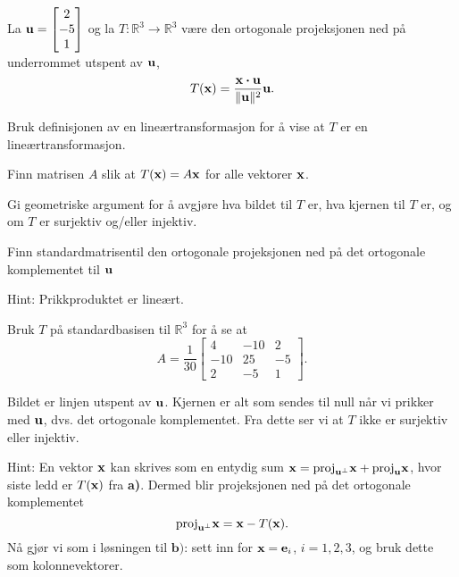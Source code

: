 
\begin{oppgave}
La $\mathbf{u}=\begin{bmatrix} 2 \\ -5 \\ 1 \end{bmatrix}$ og la $T:\mathbb{R}^3\rightarrow \mathbb{R}^3$ være den ortogonale projeksjonen ned på underrommet utspent av $\mathbf{u}$,
$$T(\mathbf{x})=\frac{\mathbf{x}\boldsymbol{\cdot} \mathbf{u}}{\|\mathbf{u} \|^2} \mathbf{u}.$$

\begin{punkt}
Bruk definisjonen av en lineærtransformasjon for å vise at $T$ er en lineærtransformasjon.
\end{punkt}

\begin{punkt}
Finn matrisen $A$ slik at $T(\mathbf{x})=A\mathbf{x}$ for alle vektorer $\mathbf{x}$.
\end{punkt}

\begin{punkt}
Gi geometriske argument for å avgjøre hva bildet til $T$ er, hva kjernen til $T$ er, og om $T$ er surjektiv og/eller injektiv.
\end{punkt}


\begin{punkt}
Finn standardmatrisentil den ortogonale projeksjonen ned på det ortogonale komplementet til $\mathbf{u}$
\end{punkt}


\end{oppgave}

\begin{losning}


\begin{punkt}
Hint: Prikkproduktet er lineært.
\end{punkt}

\begin{punkt}
Bruk $T$ på standardbasisen til $\mathbb{R}^3$ for å se at
$$A=\frac{1}{30}\begin{bmatrix}
4 & -10 & 2\\
-10 & 25 & -5\\
2 & -5 & 1
\end{bmatrix}.$$
\end{punkt}

\begin{punkt}
Bildet er linjen utspent av $\mathbf{u}$. Kjernen er alt som sendes til null når vi prikker med $\mathbf{u}$, dvs. det ortogonale komplementet. Fra dette ser vi at $T$ ikke er surjektiv eller injektiv.
\end{punkt}

\begin{punkt}
Hint: En vektor $\mathbf{x}$ kan skrives som en entydig sum $\mathbf{x}=\text{proj}_{\mathbf{u}^{\perp}}\mathbf{x}+\text{proj}_{\mathbf{u}}\mathbf{x}$, hvor siste ledd er $T(\mathbf{x})$ fra \textbf{a)}. Dermed blir projeksjonen ned på det ortogonale komplementet
$$\text{proj}_{\mathbf{u}^{\perp}}\mathbf{x}=\mathbf{x}-T(\mathbf{x}).$$ Nå gjør vi som i løsningen til $\textbf{b)}$: sett inn for $\mathbf{x}=\mathbf{e}_i$, $i=1,2,3$, og bruk dette som kolonnevektorer.
\end{punkt}

\end{losning}

